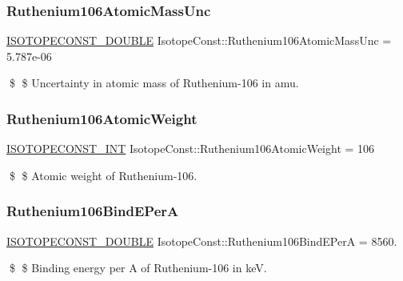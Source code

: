\subsubsection{\texorpdfstring{Ruthenium106\+Atomic\+Mass\+Unc}{Ruthenium106AtomicMassUnc}}
{\footnotesize\ttfamily \mbox{\hyperlink{group___isotope_const-_macros_ga8f45a7272ce02c0b4c65c44636ed719a}{I\+S\+O\+T\+O\+P\+E\+C\+O\+N\+S\+T\+\_\+\+D\+O\+U\+B\+LE}} Isotope\+Const\+::\+Ruthenium106\+Atomic\+Mass\+Unc = 5.\+787e-\/06}

\$ \$ Uncertainty in atomic mass of Ruthenium-\/106 in amu. \mbox{\label{group___isotope_const-_ruthenium-_ru106_gac8946233d897b3de73e3d80aabf1258c}} 
\subsubsection{\texorpdfstring{Ruthenium106\+Atomic\+Weight}{Ruthenium106AtomicWeight}}
{\footnotesize\ttfamily \mbox{\hyperlink{group___isotope_const-_macros_ga5f18360b3e99483a35c32d789e62621c}{I\+S\+O\+T\+O\+P\+E\+C\+O\+N\+S\+T\+\_\+\+I\+NT}} Isotope\+Const\+::\+Ruthenium106\+Atomic\+Weight = 106}

\$ \$ Atomic weight of Ruthenium-\/106. \mbox{\label{group___isotope_const-_ruthenium-_ru106_gaf93e0d826428c724099148e6b020bfac}} 
\subsubsection{\texorpdfstring{Ruthenium106\+Bind\+E\+PerA}{Ruthenium106BindEPerA}}
{\footnotesize\ttfamily \mbox{\hyperlink{group___isotope_const-_macros_ga8f45a7272ce02c0b4c65c44636ed719a}{I\+S\+O\+T\+O\+P\+E\+C\+O\+N\+S\+T\+\_\+\+D\+O\+U\+B\+LE}} Isotope\+Const\+::\+Ruthenium106\+Bind\+E\+PerA = 8560.}

\$ \$ Binding energy per A of Ruthenium-\/106 in keV. \mbox{\label{group___isotope_const-_ruthenium-_ru106_ga7899acf91828d589bd3acc96fb0c3e14}} 
